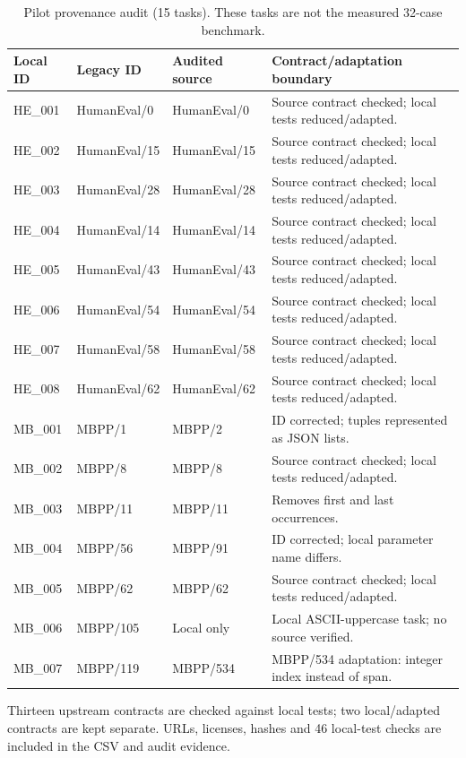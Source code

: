 \begin{table}[t]
\centering
\caption{Pilot provenance audit (15 tasks). These tasks are not the measured 32-case benchmark.}
\label{tab:dataset_catalog}
\footnotesize
\begin{tabularx}{\textwidth}{@{}lllX@{}}
\toprule
Local ID & Legacy ID & Audited source & Contract/adaptation boundary \\ \midrule
HE\_001 & HumanEval/0 & HumanEval/0 & Source contract checked; local tests reduced/adapted. \\
HE\_002 & HumanEval/15 & HumanEval/15 & Source contract checked; local tests reduced/adapted. \\
HE\_003 & HumanEval/28 & HumanEval/28 & Source contract checked; local tests reduced/adapted. \\
HE\_004 & HumanEval/14 & HumanEval/14 & Source contract checked; local tests reduced/adapted. \\
HE\_005 & HumanEval/43 & HumanEval/43 & Source contract checked; local tests reduced/adapted. \\
HE\_006 & HumanEval/54 & HumanEval/54 & Source contract checked; local tests reduced/adapted. \\
HE\_007 & HumanEval/58 & HumanEval/58 & Source contract checked; local tests reduced/adapted. \\
HE\_008 & HumanEval/62 & HumanEval/62 & Source contract checked; local tests reduced/adapted. \\
MB\_001 & MBPP/1 & MBPP/2 & ID corrected; tuples represented as JSON lists. \\
MB\_002 & MBPP/8 & MBPP/8 & Source contract checked; local tests reduced/adapted. \\
MB\_003 & MBPP/11 & MBPP/11 & Removes first and last occurrences. \\
MB\_004 & MBPP/56 & MBPP/91 & ID corrected; local parameter name differs. \\
MB\_005 & MBPP/62 & MBPP/62 & Source contract checked; local tests reduced/adapted. \\
MB\_006 & MBPP/105 & Local only & Local ASCII-uppercase task; no source verified. \\
MB\_007 & MBPP/119 & MBPP/534 & MBPP/534 adaptation: integer index instead of span. \\
\bottomrule
\end{tabularx}
\par\smallskip Thirteen upstream contracts are checked against local tests; two local/adapted contracts are kept separate. URLs, licenses, hashes and 46 local-test checks are included in the CSV and audit evidence.
\end{table}
